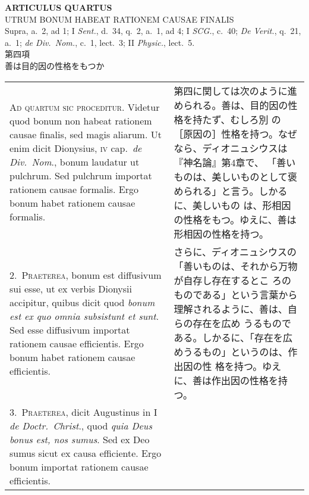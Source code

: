 \documentclass[10pt]{jsarticle}
\begin{document}
\newpage
{}

\begin{center}
 {\Large {\bf ARTICULUS QUARTUS}}\\
 {\large UTRUM BONUM HABEAT RATIONEM CAUSAE FINALIS}\\
 {\footnotesize Supra, a.~2, ad 1; I {\itshape Sent.}, d.~34, q.~2,
 a.~1, ad 4; I {\itshape SCG.}, c.~40; {\itshape De Verit.}, q.~21,
 a.~1; {\itshape de Div.~Nom.}, c.~1, lect.~3; II {\itshape Physic.}, lect.~5.}\\
 {\Large 第四項\\善は目的因の性格をもつか}
\end{center}

\begin{longtable}{p{21em}p{21em}}







{\huge A}{\scshape d quartum sic proceditur}. Videtur quod bonum non
 habeat rationem causae finalis, sed magis aliarum. Ut enim dicit
 Dionysius, {\scshape iv} cap.~{\itshape de Div.~Nom}., bonum laudatur
 ut pulchrum{\itshape }. Sed pulchrum importat rationem causae
 formalis. Ergo bonum habet rationem causae formalis.

&


第四に関しては次のように進められる。善は、目的因の性格を持たず、むしろ別
 の［原因の］性格を持つ。なぜなら、ディオニュシウスは『神名論』第4章で、
 「善いものは、美しいものとして褒められる」と言う。しかるに、美しいもの
 は、形相因の性格をもつ。ゆえに、善は形相因の性格を持つ。


\\


2.~{\scshape Praeterea}, bonum est diffusivum sui esse, ut ex verbis
 Dionysii accipitur, quibus dicit quod {\itshape bonum est ex quo omnia
 subsistunt et sunt}. Sed esse diffusivum importat rationem causae
 efficientis. Ergo bonum habet rationem causae efficientis.

&


さらに、ディオニュシウスの「善いものは、それから万物が自存し存在するとこ
 ろのものである」という言葉から理解されるように、善は、自らの存在を広め
 うるものである。しかるに、「存在を広めうるもの」というのは、作出因の性
 格を持つ。ゆえに、善は作出因の性格を持つ。



\\


3.~{\scshape Praeterea}, dicit Augustinus in I {\itshape de
 Doctr.~Christ}., quod {\itshape quia Deus bonus est, nos sumus}. Sed ex
 Deo sumus sicut ex causa efficiente. Ergo bonum importat rationem
 causae efficientis.


\end{longtable}
\end{document}
